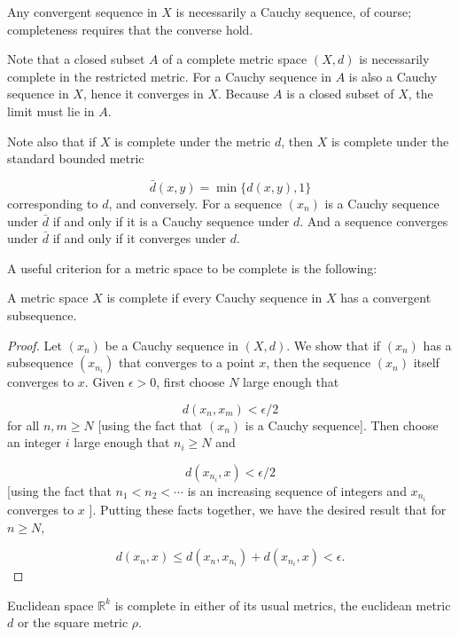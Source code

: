Any convergent sequence in \(X\) is necessarily a Cauchy sequence, of course; completeness requires that the converse hold.

Note that a closed subset \(A\) of a complete metric space \((X, d)\) is necessarily complete in the restricted metric. For a Cauchy sequence in \(A\) is also a Cauchy sequence in \(X\), hence it converges in \(X\). Because \(A\) is a closed subset of \(X\), the limit must lie in \(A\).

Note also that if \(X\) is complete under the metric \(d\), then \(X\) is complete under the standard bounded metric

\[
\bar{d}({x,y}) = \min \{ d({x,y}),1\}
\]
corresponding to \(d\), and conversely. For a sequence \((x_{n})\) is a Cauchy sequence under \(\bar{d}\) if and only if it is a Cauchy sequence under \(d\). And a sequence converges under \(\bar{d}\) if and only if it converges under \(d\).

A useful criterion for a metric space to be complete is the following:

\begin{lemma}
\label{lem:\thetheorem}
 A metric space \(X\) is complete if every Cauchy sequence in \(X\) has a convergent subsequence.
\end{lemma}

\begin{proof}
 Let \((x_{n})\) be a Cauchy sequence in \((X, d)\). We show that if \((x_{n})\) has a subsequence \((x_{n_{i}})\) that converges to a point \(x\), then the sequence \((x_{n})\) itself converges to \(x\).
Given \(\epsilon > 0\), first choose \(N\) large enough that

\[
d({x_{n},x_{m}}) < \epsilon /2
\]
for all \(n,m \geq N\) [using the fact that \((x_{n})\) is a Cauchy sequence]. Then choose an integer \(i\) large enough that \(n_{i} \geq N\) and

\[
d({x_{n_{i}},x}) < \epsilon /2
\]
[using the fact that \(n_{1} < n_{2} < \cdots\) is an increasing sequence of integers and \(x_{n_{i}}\) converges to \(x\) ]. Putting these facts together, we have the desired result that for \(n \geq N\),

\[
d({x_{n},x}) \leq d({x_{n},x_{n_{i}}}) + d({x_{n_{i}},x}) < \epsilon .
\]
\end{proof}
\begin{theorem}
\label{thm:\thetheorem}
 Euclidean space \(\mathbb{R}^{k}\) is complete in either of its usual metrics, the euclidean metric \(d\) or the square metric \(\rho\).
\end{theorem}

